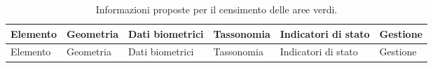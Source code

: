 \documentclass[
  a4paper,
]{book}
\begin{document}
\begin{longtable}[]{@{}
  >{\raggedright\arraybackslash}p{}
  >{\raggedright\arraybackslash}p{}
  >{\raggedright\arraybackslash}p{}
  >{\raggedright\arraybackslash}p{}
  >{\raggedright\arraybackslash}p{}
  >{\raggedright\arraybackslash}p{}@{}}
\caption{\label{tab:censimentoVerde} Informazioni proposte per il censimento delle aree verdi.}\tabularnewline
\toprule\noalign{}
\begin{minipage}[b]{\linewidth}\raggedright
Elemento
\end{minipage} & \begin{minipage}[b]{\linewidth}\raggedright
Geometria
\end{minipage} & \begin{minipage}[b]{\linewidth}\raggedright
Dati biometrici
\end{minipage} & \begin{minipage}[b]{\linewidth}\raggedright
Tassonomia
\end{minipage} & \begin{minipage}[b]{\linewidth}\raggedright
Indicatori di stato
\end{minipage} & \begin{minipage}[b]{\linewidth}\raggedright
Gestione
\end{minipage} \\
\midrule\noalign{}
\endfirsthead
\toprule\noalign{}
\begin{minipage}[b]{\linewidth}\raggedright
Elemento
\end{minipage} & \begin{minipage}[b]{\linewidth}\raggedright
Geometria
\end{minipage} & \begin{minipage}[b]{\linewidth}\raggedright
Dati biometrici
\end{minipage} & \begin{minipage}[b]{\linewidth}\raggedright
Tassonomia
\end{minipage} & \begin{minipage}[b]{\linewidth}\raggedright
Indicatori di stato
\end{minipage} & \begin{minipage}[b]{\linewidth}\raggedright
Gestione
\end{minipage} \\

\end{longtable}
\end{document}
